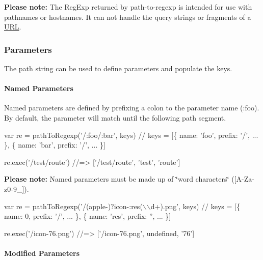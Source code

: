 

{\bfseries Please note\+:} The {\ttfamily Reg\+Exp} returned by {\ttfamily path-\/to-\/regexp} is intended for use with pathnames or hostnames. It can not handle the query strings or fragments of a \mbox{\hyperlink{namespace_u_r_l}{U\+RL}}.

\subsubsection*{Parameters}

The path string can be used to define parameters and populate the keys.

\paragraph*{Named Parameters}

Named parameters are defined by prefixing a colon to the parameter name ({\ttfamily \+:foo}). By default, the parameter will match until the following path segment.


\begin{DoxyCode}
var re = pathToRegexp('/:foo/:bar', keys)
// keys = [\{ name: 'foo', prefix: '/', ... \}, \{ name: 'bar', prefix: '/', ... \}]

re.exec('/test/route')
//=> ['/test/route', 'test', 'route']
\end{DoxyCode}


{\bfseries Please note\+:} Named parameters must be made up of \char`\"{}word characters\char`\"{} ({\ttfamily \mbox{[}A-\/\+Za-\/z0-\/9\+\_\+\mbox{]}}).


\begin{DoxyCode}
var re = pathToRegexp('/(apple-)?icon-:res(\(\backslash\)\(\backslash\)d+).png', keys)
// keys = [\{ name: 0, prefix: '/', ... \}, \{ name: 'res', prefix: '', ... \}]

re.exec('/icon-76.png')
//=> ['/icon-76.png', undefined, '76']
\end{DoxyCode}


\paragraph*{Modified Parameters}

